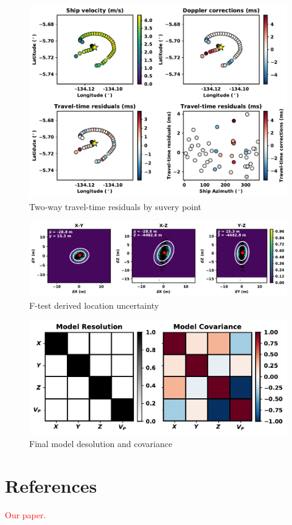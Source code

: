 \documentclass[titlepage]{article}
\begin{document}
  \begin{figure}[!htb]
   \includegraphics[width=\linewidth]{tt_resids.pdf}
   \caption{Two-way travel-time residuals by suvery point}
  \end{figure}
  
  \begin{figure}[!htb]
   \includegraphics[width=\linewidth]{ftest.pdf}
   \caption{F-test derived location uncertainty}
  \end{figure}
  
  \begin{figure}[!htb]
   \centering
   \includegraphics[width=0.9\linewidth]{resolution_matrices.pdf}
   \caption{Final model desolution and covariance}
  \end{figure}

 \section*{References}
 \textcolor{red}{Our paper.}
\end{document}
